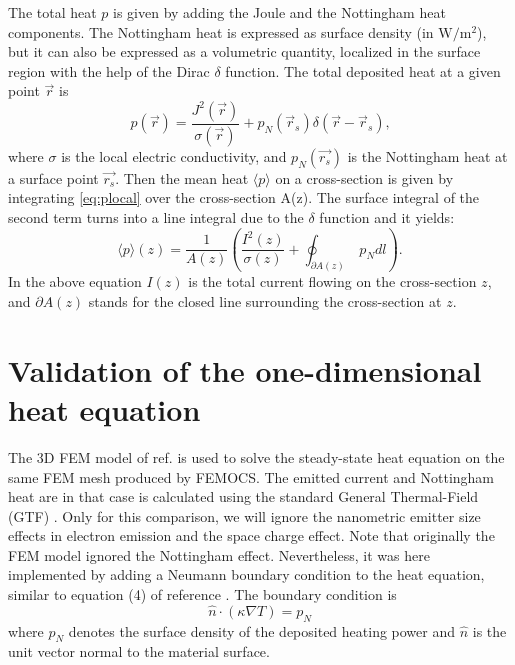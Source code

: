 \documentclass[%
 aps,
 prb,%
 amsmath,amssymb,
reprint,%
superscriptaddress,
]{revtex4-1}
\begin{document}
The total heat $p$ is given by adding the Joule and the Nottingham heat components. The Nottingham heat is expressed as surface density (in $\textrm{W}/\textrm{m}^2$), but it can also be expressed as a volumetric quantity, localized in the surface region with the help of the Dirac $\delta$ function. The total deposited heat at a given point $\vec{r}$ is
\begin{equation} \label{eq:plocal}
	p(\vec{r}) = \frac{J^2(\vec{r})}{\sigma(\vec{r})} + p_N(\vec{r}_s) \delta(\vec{r} - \vec{r}_s) \textrm{,}	
\end{equation}
where $\sigma$ is the local electric conductivity, and $p_N(\vec{r_s})$ is the Nottingham heat at a surface point $\vec{r_s}$.
Then the mean heat $\langle p \rangle$ on a cross-section is given by integrating \eqref{eq:plocal} over the cross-section A(z).
The surface integral of the second term turns into a line integral due to the $\delta$ function and it yields: 
\begin{equation} \label{eq:pslice}
	\langle p \rangle (z) = \frac{1}{A(z)} \left( \frac{I^2(z)}{\sigma(z)} + \oint_{\partial A(z)}~p_N dl \right) \textrm{.}
\end{equation}
In the above equation $I(z)$ is the total current flowing on the cross-section $z$, and $\partial A(z)$ stands for the closed line surrounding the cross-section at $z$. 

\section{Validation of the one-dimensional heat equation} 
\label{sec:1dvalid}

\renewcommand\thefigure{\thesection.\arabic{figure}} 
\setcounter{figure}{0}  

The 3D FEM model of ref. \cite{Eimre2015} is used to solve the steady-state heat equation on the same FEM mesh produced by FEMOCS. The emitted current and Nottingham heat are in that case is calculated using the standard General Thermal-Field (GTF) \cite{Jensen2006}.
Only for this comparison, we will ignore the nanometric emitter size effects in electron emission and the space charge effect.
Note that originally the FEM model ignored the Nottingham effect. Nevertheless, it was here implemented by adding a Neumann boundary condition to the heat equation, similar to equation (4) of reference \cite{Eimre2015}. The boundary condition is
\begin{equation}
	\hat{n} \cdot \left( \kappa \nabla T \right) = p_N
\end{equation}
where $p_N$ denotes the surface density of the deposited heating power and $\hat{n}$ is the unit vector normal to the material surface.
\end{document}
